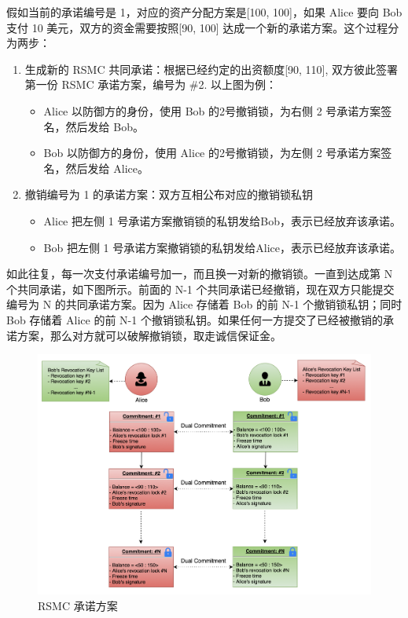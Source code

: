 假如当前的承诺编号是 1，对应的资产分配方案是[100, 100]，如果 Alice 要向 Bob 支付 10 美元，双方的资金需要按照[90, 100] 达成一个新的承诺方案。这个过程分为两步：
\begin{enumerate}

    \item 生成新的 RSMC 共同承诺：根据已经约定的出资额度[90, 110], 双方彼此签署第一份 RSMC 承诺方案，编号为 \#2. 以上图为例：
        \begin{itemize}
            \item Alice 以防御方的身份，使用 Bob 的2号撤销锁，为右侧 2 号承诺方案签名，然后发给 Bob。
            \item Bob 以防御方的身份，使用 Alice 的2号撤销锁，为左侧 2 号承诺方案签名，然后发给 Alice。
        \end{itemize}

    \item 撤销编号为 1 的承诺方案：双方互相公布对应的撤销锁私钥
        \begin{itemize}
            \item Alice 把左侧 1 号承诺方案撤销锁的私钥发给Bob，表示已经放弃该承诺。
            \item Bob 把左侧 1 号承诺方案撤销锁的私钥发给Alice，表示已经放弃该承诺。
        \end{itemize}
\end{enumerate}

如此往复，每一次支付承诺编号加一，而且换一对新的撤销锁。一直到达成第 N 个共同承诺，如下图所示。前面的 N-1 个共同承诺已经撤销，现在双方只能提交编号为 N 的共同承诺方案。因为 Alice 存储着 Bob 的前 N-1 个撤销锁私钥；同时 Bob 存储着 Alice 的前 N-1 个撤销锁私钥。如果任何一方提交了已经被撤销的承诺方案，那么对方就可以破解撤销锁，取走诚信保证金。

\begin{figure}[h!]
    \centering
    \includegraphics[width=12cm, keepaspectratio]{../images/dual_rsmc_3.png}
    \caption{RSMC 承诺方案}
    \label{fig:rsmc_3}
\end{figure}

